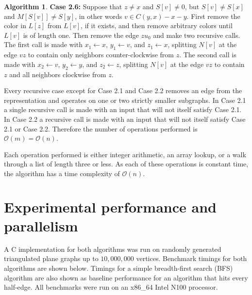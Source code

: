 \documentclass[12pt,letterpaper]{article}
\theoremstyle{plain}
\theoremstyle{definition}
\theoremstyle{break}
\newtheorem{algorithm}[lemma]{Algorithm}     %
\begin{document}
\begin{algorithm}
    \textbf{Case 2.6:} Suppose that $z\ne x$ and $S[v]\ne 0$, but
    $S[v]\ne S[x]$ and $M[S[v]]\ne S[y]$, in other words $v\in C(y,x)-x-y$.
    First remove the color in $L[z]$ from $L[v]$, if it exists, and then remove
    arbitrary colors until $L[v]$ is of length one. Then remove the edge $zu_0$
    and make two recursive calls. The first call is made with $x_1\leftarrow x$,
    $y_1\leftarrow v$, and $z_1\leftarrow x$, splitting $N[v]$ at the edge $vz$
    to contain only neighbors counter-clockwise from $z$. The second call is
    made with $x_2\leftarrow v$, $y_2\leftarrow y$, and $z_2\leftarrow z$,
    splitting $N[v]$ at the edge $vz$ to contain $z$ and all neighbors clockwise
    from $z$.
\end{algorithm}

Every recursive case except for Case 2.1 and Case 2.2 removes an edge
from the representation and operates on one or two
strictly smaller subgraphs. In Case 2.1 a single recursive call is made
with an input that will not itself satisfy Case 2.1. In Case 2.2 a recursive
call is made with an input that will not itself satisfy Case 2.1 or Case 2.2.
Therefore the number of operations performed
is $\mathcal{O}(m)=\mathcal{O}(n)$.

Each operation performed is either integer arithmetic, an
array lookup, or a walk through a list of length three or less.
As each of these operations is constant time,
the algorithm has a time complexity of $\mathcal{O}(n)$.

\section{Experimental performance and parallelism}

A C implementation for both algorithms was run on randomly generated
triangulated plane graphs up to $10,000,000$ vertices. Benchmark timings
for both algorithms are shown below. Timings for a simple 
breadth-first search
(BFS) algorithm are also shown as baseline performance
for an algorithm that hits every half-edge.
All benchmarks
were run on an x86\_64 Intel N100 processor.
\end{document}
